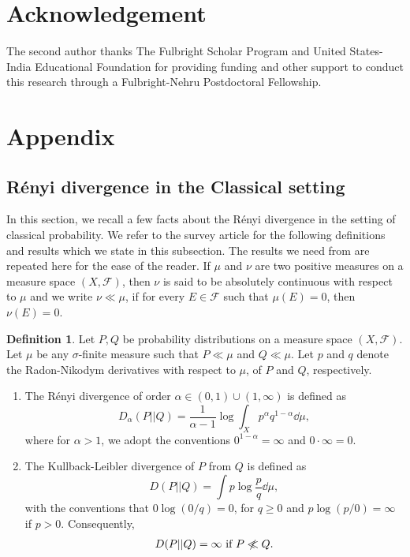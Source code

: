 \documentclass[12pt,a4paper,oneside]{article}
\numberwithin{equation}{section}
\theoremstyle{definition}  %
\newtheorem{defn}{Definition}[section]
\theoremstyle{plain}  %
\theoremstyle{remark} %
\newcommand{\nll}{\centernot{\ll}}
\begin{document}
\section*{Acknowledgement}
The second author thanks The Fulbright Scholar Program and United States-India Educational Foundation for providing funding and other support to conduct this research through a Fulbright-Nehru Postdoctoral Fellowship.







\appendix
\section{Appendix}
\subsection{R\'enyi divergence  in the Classical setting}\label{sec:classical-renyi-devergence}
In this section, we recall a few facts about the R\'enyi divergence in the setting of classical probability. We refer to the survey article \cite{Erven-Harremos-2014} for the following definitions and results which we state in this subsection. The results we need from \cite{Erven-Harremos-2014}  are repeated here for the ease of the reader. If $\mu$ and $\nu$ are two positive measures on a measure space $(X,\mathcal{F})$, then $\nu$ is said to be absolutely continuous with respect to $
\mu$ and we write $\nu\ll \mu$, if for every $E\in \mathcal{F}$ such that $\mu (E) = 0$, then $\nu(E) = 0$.
\begin{defn}\label{defn:renyi-divergence-Kullback}
 Let $P, Q$ be probability distributions on a measure space $(X, \mathcal{F})$. Let $\mu$ be any $\sigma$-finite measure such that $P\ll\mu$ and $Q\ll\mu$. Let $p$ and $q$  denote the Radon-Nikodym derivatives with respect to $\mu$, of $P$ and $Q$, respectively. \begin{enumerate}
     \item The R\'enyi divergence of order $\alpha\in (0,1)\cup (1,\infty)$ is defined as \begin{equation}
     \label{eq:classical-renyi-alpha}
     D_{\alpha}(P||Q) = \frac{1}{\alpha-1} \log \int_X p^\alpha q^{1-\alpha} \dd \mu,
 \end{equation}
 where for $\alpha>1$, we adopt the conventions $0^{1-\alpha} = \infty$ and $0\cdot \infty = 0$.
 \item\label{defn:kullback-leibler} The Kullback-Leibler divergence of $P$ from $Q$ is defined as 
 \begin{equation}
  D(P||Q) = \int p\log \frac{p}{q} \dd \mu,
 \end{equation}
 with the conventions that $0\log (0/q) = 0$, for $q\geq0$ and $p\log(p/0)=\infty$ if $p>0$. Consequently, \begin{align}\label{eq:kullback-leibler-equals-infty}
     D(P||Q) = \infty \textnormal{ if } P\nll Q.
 \end{align}
 \end{enumerate}    
\end{defn}
\end{document}
